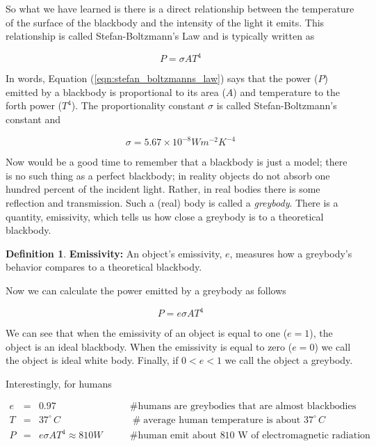 \documentclass{article}
\theoremstyle{definition}
\newtheorem{definition}{Definition}[section]
\begin{document}
\noindent
So what we have learned is there is a direct relationship between
the temperature of the surface of the blackbody and the
intensity of the light it emits. This relationship is called
Stefan-Boltzmann's Law and is typically written as

\begin{equation}
P = \sigma A T^4
\label{eqn:stefan_boltzmanns_law}
\end{equation}

\bigskip
\noindent
In words, Equation (\ref{eqn:stefan_boltzmanns_law}) says that
the power ($P$) emitted by a blackbody is proportional to its
area ($A$) and temperature to the forth power ($T^4$).  The
proportionality constant $\sigma$ is called Stefan-Boltzmann's
constant and

\begin{equation*}
\sigma = 5.67 \times 10^{-8} W m^{-2} K^{-4}
\end{equation*}

\bigskip
\noindent
Now would be a good time to remember that a blackbody is just a
model; there is no such thing as a perfect blackbody; in reality
objects do not absorb one hundred percent of the incident
light. Rather, in real bodies there is some reflection and
transmission. Such a (real) body is called a \emph{greybody}. 
There is a quantity, emissivity, which tells us how close
a greybody is to a theoretical blackbody.

\begin{definition}
{\bf Emissivity: } An object's emissivity, $e$, measures how a
greybody's behavior compares to a theoretical blackbody.
\end{definition}

\noindent
Now we can calculate the power emitted by a greybody
as follows 

\begin{equation}
P = e\sigma A T^4
\label{eqn:grey_body_power}
\end{equation}

\medskip
\noindent
We can see that when the emissivity of an object is equal to one
($e = 1$), the object is an ideal blackbody. When the emissivity
is equal to zero ($e = 0$) we call the object is ideal white
body. Finally, if $0 < e < 1$ we call the object a greybody.

\bigskip
\noindent
Interestingly, for humans

\begin{equation*}
\begin{array}{llll}
e &=& 0.97							&\qquad \mathrel{\#} \text{humans are greybodies that are almost blackbodies} \\
[5pt]
T &=& 37^{\circ} \, C				&\qquad \mathrel{\#} \text{average human temperature is about $37^{\circ} \, C$} \\
[5pt]
P &=& e \sigma A T^4 \approx 810 W	&\qquad \mathrel{\#} \text{human emit about 810 W of electromagnetic radiation} 
\end{array}
\end{equation*}
\end{document}

